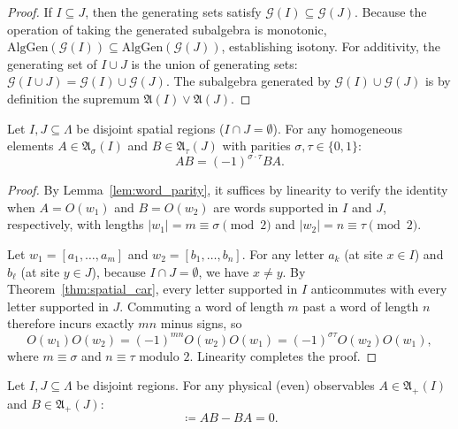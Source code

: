\begin{proof}
If $I \subseteq J$, then the generating sets satisfy $\mathcal{G}(I) \subseteq \mathcal{G}(J)$. Because the operation of taking the generated subalgebra is monotonic, $\mathrm{AlgGen}(\mathcal{G}(I)) \subseteq \mathrm{AlgGen}(\mathcal{G}(J))$, establishing isotony.
For additivity, the generating set of $I \cup J$ is the union of generating sets: $\mathcal{G}(I \cup J) = \mathcal{G}(I) \cup \mathcal{G}(J)$. The subalgebra generated by $\mathcal{G}(I) \cup \mathcal{G}(J)$ is by definition the supremum $\mathfrak{A}(I) \vee \mathfrak{A}(J)$.
\end{proof}

\begin{theorem}
\label{thm:twisted_locality}
Let $I, J \subseteq \Lambda$ be disjoint spatial regions ($I \cap J = \emptyset$). For any homogeneous elements $A \in \mathfrak{A}_\sigma(I)$ and $B \in \mathfrak{A}_\tau(J)$ with parities $\sigma, \tau \in \{0, 1\}$:
\begin{equation}
A B = (-1)^{\sigma \cdot \tau} B A.
\end{equation}
\end{theorem}

\begin{proof}
By Lemma~\ref{lem:word_parity}, it suffices by linearity to verify the identity when $A = O(w_1)$ and $B = O(w_2)$ are words supported in $I$ and $J$, respectively, with lengths $|w_1| = m \equiv \sigma \pmod 2$ and $|w_2| = n \equiv \tau \pmod 2$.

Let $w_1 = [a_1, \dots, a_m]$ and $w_2 = [b_1, \dots, b_n]$. For any letter $a_k$ (at site $x \in I$) and $b_\ell$ (at site $y \in J$), because $I \cap J = \emptyset$, we have $x \neq y$.
By Theorem~\ref{thm:spatial_car}, every letter supported in $I$ anticommutes with every letter supported in $J$. Commuting a word of length $m$ past a word of length $n$ therefore incurs exactly $mn$ minus signs, so
\begin{equation}
O(w_1)O(w_2)=(-1)^{mn}O(w_2)O(w_1)=(-1)^{\sigma\tau}O(w_2)O(w_1),
\end{equation}
where $m\equiv\sigma$ and $n\equiv\tau$ modulo $2$. Linearity completes the proof.
\end{proof}

\begin{corollary}
\label{cor:observable_locality}
Let $I, J \subseteq \Lambda$ be disjoint regions. For any physical (even) observables $A \in \mathfrak{A}_+(I)$ and $B \in \mathfrak{A}_+(J)$:
\begin{equation}
[A, B] \coloneqq A B - B A = 0.
\end{equation}
\end{corollary}

